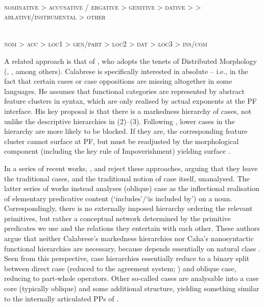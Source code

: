 \documentclass[output=paper]{langsci/langscibook}
\begin{document}
\ea%
\label{ex:intro:2}\citep[156]{Blake2001}\\
\textsc{nominative > accusative / ergative > genitive > dative >  > ablative\slash instrumental > other}    
 \z

\ea%
\label{ex:intro:3}\citep[32]{Caha2009}\\
\textsc{nom > acc > loc1 > gen\slash part > loc2 > dat > loc3 > ins\slash com}
\z

A related approach is that of \citet{Calabrese2008}, who adopts the tenets of Distributed Morphology (\citealt{Halle1993}, \citealt{Embick2006}, among others). Calabrese is specifically interested in absolute  – i.e., in the fact that certain cases or case oppositions are missing altogether in some languages. He assumes that functional categories are represented by abstract feature clusters in syntax, which are only realised by actual exponents at the PF interface. His key proposal is that there is a markedness hierarchy of cases, not unlike the descriptive hierarchies in (2)–(3). Following \citet{Blake2001}, lower cases in the hierarchy are more likely to be blocked. If they are, the corresponding feature cluster cannot surface at PF, but must be readjusted by the morphological component (including the key rule of Impoverishment) yielding surface .

In a series of recent works, \citet{Manzini2011Grammatical}, \citet{Manzini2016} and \citet{Franco2017} reject these approaches, arguing that they leave the traditional cases, and the traditional notion of case itself, unanalysed. The latter series of works instead analyses (oblique) case as the inflectional realisation of elementary predicative content (‘includes’\slash ‘is included by’) on a noun. Correspondingly, there is no externally imposed hierarchy ordering the relevant primitives, but rather a conceptual network determined by the primitive predicates we use and the relations they entertain with each other. These authors argue that neither Calabrese’s markedness hierarchies nor Caha’s nanosyntactic functional hierarchies are necessary, because  depends essentially on natural class \citep{Müller2007}. Seen from this perspective, case hierarchies essentially reduce to a binary split between direct case (reduced to the agreement system; \citealt{Chomsky2001Derivation}) and oblique case, reducing to part-whole operators. Other so-called cases are analysable into a case core (typically oblique) and some additional structure, yielding something similar to the internally articulated PPs of \citet{Svenonius2006}.
\end{document}
